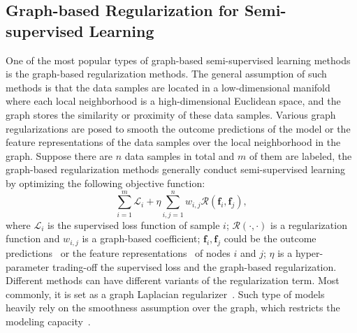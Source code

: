 \documentclass{article}
\def\vf{{\bm{f}}}
\def\gL{{\mathcal{L}}}
\def\gR{{\mathcal{R}}}
\begin{document}
\subsection{Graph-based Regularization for Semi-supervised Learning}
One of the most popular types of graph-based semi-supervised learning methods is the graph-based regularization methods. The general assumption of such methods is that the data samples are located in a low-dimensional manifold where each local neighborhood is a high-dimensional Euclidean space, and the graph stores the similarity or proximity of these data samples. Various graph regularizations are posed to smooth the outcome predictions of the model or the feature representations of the data samples over the local neighborhood in the graph. Suppose there are $n$ data samples in total and $m$ of them are labeled, the graph-based regularization methods generally conduct semi-supervised learning by optimizing the following objective function:
$$\sum_{i=1}^m\gL_i + \eta \sum_{i,j=1}^n w_{i,j} \gR(\vf_i, \vf_j),$$
where $\gL_i$ is the supervised loss function of sample $i$; $\gR(\cdot, \cdot)$ is a regularization function and $w_{i,j}$ is a graph-based coefficient; $\vf_i, \vf_j$ could be the outcome predictions~\cite{zhu2003semi,zhou2004learning,belkin2006manifold} or the feature representations~\cite{mei2008general,weston2012deep,li2019prediction} of nodes $i$ and $j$; $\eta$ is a hyper-parameter trading-off the supervised loss and the graph-based regularization. Different methods can have different variants of the regularization term. Most commonly, it is set as a graph Laplacian regularizer~\cite{zhu2003semi,zhou2004learning,belkin2006manifold,mei2008general,weston2012deep}. Such type of models heavily rely on the smoothness assumption over the graph, which restricts the modeling capacity~\cite{kipf2016semi}.  
\end{document}
